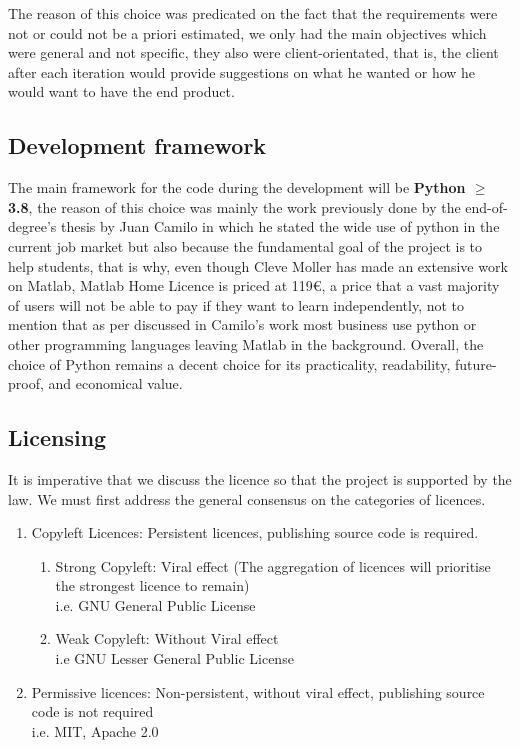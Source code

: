 The reason of this choice was predicated on the fact that the requirements were not or could not be a priori estimated, we only had the main objectives which were general and not specific, they also were client-orientated, that is, the client after each iteration would provide suggestions on what he wanted or how he would want to have the end product.

\subsection{Development framework}
The main framework for the code during the development will be \textbf{Python $\ge$ 3.8}, the reason of this choice was mainly the work previously done by the end-of-degree's thesis by Juan Camilo in which he stated the wide use of python in the current job market but also because the fundamental goal of the project is to help students, that is why, even though Cleve Moller has made an extensive work on Matlab, Matlab Home Licence is priced at 119€, a price that a vast majority of users will not be able to pay if they want to learn independently, not to mention that as per discussed in Camilo's work most business use python or other programming languages leaving Matlab in the background. Overall, the choice of Python remains a decent choice for its practicality, readability, future-proof, and economical value.

\subsection{Licensing}
It is imperative that we discuss the licence so that the project is supported by the law. We must first address the general consensus on the categories of licences.
\begin{enumerate}
    \item Copyleft Licences: Persistent licences, publishing source code is required.
        \begin{enumerate}
            \item Strong Copyleft: Viral effect (The aggregation of licences will prioritise the strongest licence to remain)\\
            i.e. GNU General Public License
            \item Weak Copyleft: Without Viral effect\\
            i.e GNU Lesser General Public License
        \end{enumerate}
    \item Permissive licences: Non-persistent, without viral effect, publishing source code is not required\\
    i.e. MIT, Apache 2.0
\end{enumerate}

